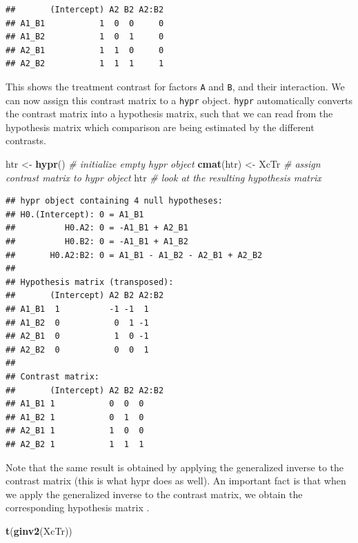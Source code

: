 \documentclass[12pt,]{krantz}
\newenvironment{Shaded}{\begin{snugshade}}{\end{snugshade}}
\newcommand{\CommentTok}[1]{\textcolor[rgb]{0.56,0.35,0.01}{\textit{#1}}}
\newcommand{\KeywordTok}[1]{\textcolor[rgb]{0.13,0.29,0.53}{\textbf{#1}}}
\newcommand{\NormalTok}[1]{#1}
\newcommand{\StringTok}[1]{\textcolor[rgb]{0.31,0.60,0.02}{#1}}
\theoremstyle{definition}
\theoremstyle{definition}
\theoremstyle{definition}
\theoremstyle{remark}
\begin{document}
\begin{verbatim}
##       (Intercept) A2 B2 A2:B2
## A1_B1           1  0  0     0
## A1_B2           1  0  1     0
## A2_B1           1  1  0     0
## A2_B2           1  1  1     1
\end{verbatim}

This shows the treatment contrast for factors \texttt{A} and \texttt{B}, and their interaction. We can now assign this contrast matrix to a \texttt{hypr} object. \texttt{hypr} automatically converts the contrast matrix into a hypothesis matrix, such that we can read from the hypothesis matrix which comparison are being estimated by the different contrasts.

\begin{Shaded}
\begin{Highlighting}[]
\NormalTok{htr <-}\StringTok{ }\KeywordTok{hypr}\NormalTok{() }\CommentTok{# initialize empty hypr object}
\KeywordTok{cmat}\NormalTok{(htr) <-}\StringTok{ }\NormalTok{XcTr }\CommentTok{# assign contrast matrix to hypr object}
\NormalTok{htr }\CommentTok{# look at the resulting hypothesis matrix}
\end{Highlighting}
\end{Shaded}

\begin{verbatim}
## hypr object containing 4 null hypotheses:
## H0.(Intercept): 0 = A1_B1
##          H0.A2: 0 = -A1_B1 + A2_B1
##          H0.B2: 0 = -A1_B1 + A1_B2
##       H0.A2:B2: 0 = A1_B1 - A1_B2 - A2_B1 + A2_B2
## 
## Hypothesis matrix (transposed):
##       (Intercept) A2 B2 A2:B2
## A1_B1  1          -1 -1  1   
## A1_B2  0           0  1 -1   
## A2_B1  0           1  0 -1   
## A2_B2  0           0  0  1   
## 
## Contrast matrix:
##       (Intercept) A2 B2 A2:B2
## A1_B1 1           0  0  0    
## A1_B2 1           0  1  0    
## A2_B1 1           1  0  0    
## A2_B2 1           1  1  1
\end{verbatim}

Note that the same result is obtained by applying the generalized inverse to the contrast matrix (this is what hypr does as well). An important fact is that when we apply the generalized inverse to the contrast matrix, we obtain the corresponding hypothesis matrix \citep[for details see][]{schad2020capitalize}.

\begin{Shaded}
\begin{Highlighting}[]
\KeywordTok{t}\NormalTok{(}\KeywordTok{ginv2}\NormalTok{(XcTr))}
\end{Highlighting}
\end{Shaded}
\end{document}
